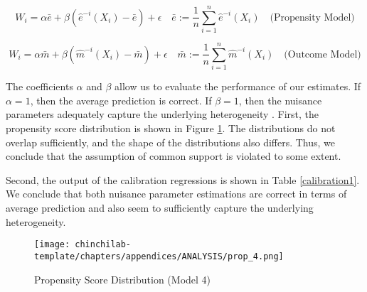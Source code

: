 \begin{equation}
W_{i}=\alpha \bar{e}+\beta\left(\hat{e}^{-i}\left(X_{i}\right)-\bar{e}\right)+\epsilon \quad \bar{e}:=\frac{1}{n} \sum_{i=1}^{n} \hat{e}^{-i}\left(X_{i}\right) \quad \text{(Propensity Model)}
\end{equation}

\begin{equation}
W_{i}=\alpha \bar{m}+\beta\left(\hat{m}^{-i}\left(X_{i}\right)-\bar{m}\right)+\epsilon \quad \bar{m}:=\frac{1}{n} \sum_{i=1}^{n} \hat{m}^{-i}\left(X_{i}\right) \quad \text{(Outcome Model)}
\end{equation}

The coefficients $\alpha$ and $\beta$ allow us to evaluate the performance of our estimates. If $\alpha=1$, then the average prediction is correct. If $\beta=1$, then the nuisance parameters adequately capture the underlying heterogeneity \cite{athey}. First, the propensity score distribution is shown in Figure \ref{prop4}. The distributions do not overlap sufficiently, and the shape of the distributions also differs. Thus, we conclude that the assumption of common support is violated to some extent.

Second, the output of the calibration regressions is shown in Table \ref{calibration1}. We conclude that both nuisance parameter estimations are correct in terms of average prediction and also seem to sufficiently capture the underlying heterogeneity.

\begin{figure}[H]
    \centering
    \texttt{[image: chinchilab-template/chapters/appendices/ANALYSIS/prop\_4.png]}
    \caption{Propensity Score Distribution (Model 4)}
    \label{prop4}
\end{figure}



